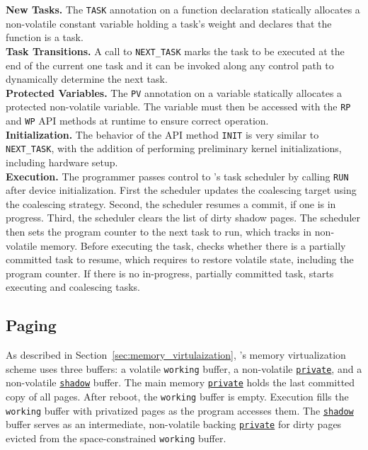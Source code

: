 
\noindent\textbf{New Tasks.} The \texttt{TASK} annotation on a function
declaration statically allocates a non-volatile constant variable holding a
task's weight and declares that the function is a task.\\
%
\noindent\textbf{Task Transitions.} A call to \texttt{NEXT\_TASK} marks the task to be executed at the 
end of the current one task and it can be invoked along
any control path to dynamically determine the next task.\\
%
\noindent\textbf{Protected Variables.} The \texttt{PV} annotation on a
variable statically allocates a protected non-volatile variable. The
variable must then be accessed with the \texttt{RP} and \texttt{WP} API methods at
runtime to ensure correct operation.\\
%
\noindent\textbf{Initialization.} The behavior of the API method
\texttt{INIT} is very similar to \texttt{NEXT\_TASK}, with the
addition of performing preliminary kernel initializations, including hardware setup.\\
%
\noindent\textbf{Execution.} The programmer passes control to \sys's task scheduler 
by calling \texttt{RUN} after device initialization. 
%
First the scheduler updates the coalescing target using the coalescing
strategy.  Second, the scheduler resumes a commit, if one is in progress. Third,
the scheduler clears the list of dirty shadow pages. The scheduler then 
sets the program counter to the next task to run, which \sys tracks in  
non-volatile memory.  
%
Before executing the task, \sys checks whether there is a partially committed
task to resume, which requires \sys to restore volatile state, including the program
counter.  
%
If there is no in-progress, partially committed task, \sys starts executing and
coalescing tasks. 


\subsection{Paging}
\label{sec:impl:paging}

As described in Section~\ref{sec:memory_virtulaization}, \sys's memory
virtualization scheme uses three buffers: a volatile \texttt{working} buffer, a
non-volatile \texttt{\underline{private}}, and a non-volatile
\texttt{\underline{shadow}} buffer. 
%
The main memory \texttt{\underline{private}} holds the last committed copy of all 
pages. 
%
After reboot, the \texttt{working} buffer is empty. Execution fills 
the \texttt{working} buffer with privatized pages as the program accesses them. 
%
The \texttt{\underline{shadow}} buffer serves as an intermediate,
non-volatile backing \texttt{\underline{private}} for dirty pages evicted from the space-constrained
\texttt{working} buffer. 

